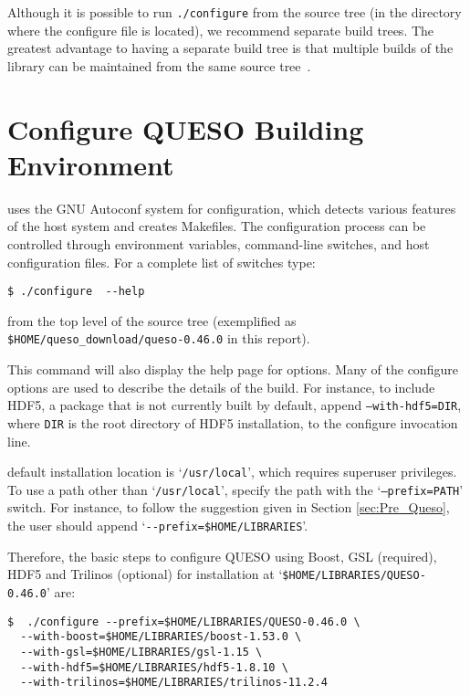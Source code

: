 Although it is possible to run \verb+./configure+ from the source tree (in the directory where the configure file is located), we recommend separate build trees. The greatest advantage to having a separate build tree is that multiple builds of the library
can be maintained from the same source tree~\cite{Trilinos}. 


\section{Configure QUESO Building Environment}\label{sec:Queso_configure}

\Queso{} uses the GNU Autoconf system for configuration, which detects various features of the host system and creates Makefiles. 
The configuration process can be controlled through environment variables, command-line switches, and host configuration files.
For a complete list of switches type:
\begin{lstlisting}
$ ./configure  --help  
\end{lstlisting}
%
from the top level of the source tree (exemplified as \verb+$HOME/queso_download/queso-0.46.0+ in this report). 

This command will also display the help page for \Queso{} options.  Many of the \Queso{} configure options are used to describe 
the details of the build. For instance, to include HDF5, a package that is not currently built by default, append \texttt{--with-hdf5=DIR}, 
where \texttt{DIR} is the root directory of HDF5 installation,  to the configure invocation line. 

\Queso{} default installation location is `\texttt{/usr/local}', which requires superuser privileges. To use a path
 other than `\texttt{/usr/local}', specify the path with the `\texttt{--prefix=PATH}' switch. For instance, to follow the suggestion
 given in Section \ref{sec:Pre_Queso}, the user should append `\verb+--prefix=$HOME/LIBRARIES+'.



Therefore, the basic steps to configure QUESO using Boost, GSL (required), HDF5 and Trilinos (optional) for installation at `\verb+$HOME/LIBRARIES/QUESO-0.46.0+' are:
\begin{lstlisting}
$  ./configure --prefix=$HOME/LIBRARIES/QUESO-0.46.0 \
  --with-boost=$HOME/LIBRARIES/boost-1.53.0 \
  --with-gsl=$HOME/LIBRARIES/gsl-1.15 \
  --with-hdf5=$HOME/LIBRARIES/hdf5-1.8.10 \
  --with-trilinos=$HOME/LIBRARIES/trilinos-11.2.4
  \end{lstlisting}

